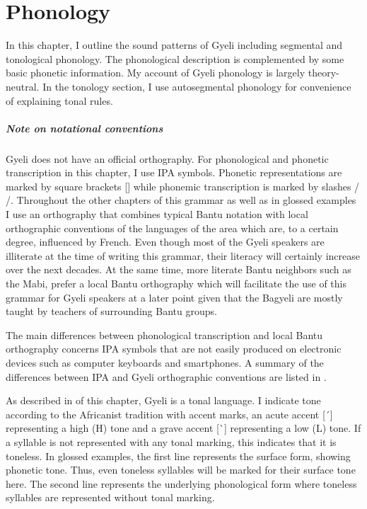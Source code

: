 \chapter{Phonology}
\label {sec:Phon}

In this chapter, I outline the sound patterns of Gyeli including segmental and tonological phonology. The phonological description is complemented by some basic phonetic information.
My account of Gyeli phonology is largely theory-neutral. In the tonology section, I use autosegmental phonology for convenience of explaining tonal rules.

\paragraph{Note on notational conventions} Gyeli does not have an official orthography. For phonological and phonetic transcription in this chapter, I use IPA symbols. Phonetic representations are marked by square brackets [] while phonemic transcription is marked by slashes / /.
 Throughout the other chapters of this grammar as well as in glossed examples I use an orthography that combines typical Bantu notation with local orthographic conventions of the languages of the area which are, to a certain degree, influenced by French. Even though most of the Gyeli speakers are illiterate at the time of writing this grammar, their literacy will certainly increase over the next decades. At the same time, more literate Bantu neighbors such as the Mabi, prefer a local Bantu orthography which will facilitate the use of this grammar for Gyeli speakers at a later point given that the Bagyeli are mostly taught by teachers of surrounding Bantu groups.


The main differences between phonological transcription and local Bantu orthography concerns IPA symbols that are not easily produced on electronic devices such as computer keyboards and smartphones. A summary of the differences between IPA and Gyeli orthographic  conventions are listed in . 

As described in  of this chapter, Gyeli is a tonal language. I indicate tone according to the Africanist tradition with accent marks, an acute accent [\  ́] representing a high (H) tone and a grave accent [\  ̀] representing a low (L) tone. If a syllable is not represented with any tonal marking, this indicates that it is toneless.
In glossed examples, the first line represents the surface form, showing phonetic tone. Thus, even toneless syllables will be marked for their surface tone here. The second line represents the underlying phonological form where toneless syllables are represented without tonal marking.

